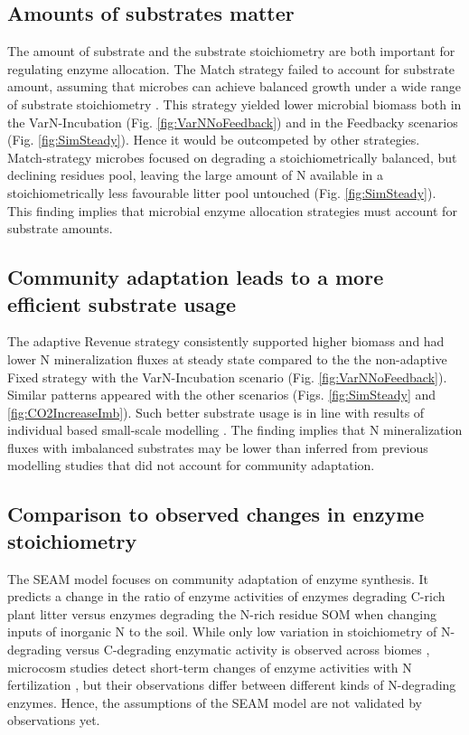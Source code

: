\subsection{Amounts of substrates matter}
The amount of substrate and the substrate stoichiometry are both important for
regulating enzyme allocation. The Match strategy failed to account for substrate
amount, assuming that microbes can achieve balanced growth under a wide range of
substrate stoichiometry \citep{Moorhead12, Ballantyne14}. This strategy yielded
lower microbial biomass both in the VarN-Incubation (Fig.
\ref{fig:VarNNoFeedback}) and in the Feedbacky scenarios (Fig.
\ref{fig:SimSteady}). Hence it would be outcompeted by other strategies.
Match-strategy microbes focused on degrading a stoichiometrically balanced, but
declining residues pool, leaving the large amount of N available in a
stoichiometrically less favourable litter pool untouched (Fig.
\ref{fig:SimSteady}). This finding implies that microbial enzyme allocation
strategies must account for substrate amounts.

\subsection{Community adaptation leads to a more efficient substrate usage}
The adaptive Revenue strategy consistently supported higher biomass and had
lower N mineralization fluxes at steady state compared to the the non-adaptive
Fixed strategy with the VarN-Incubation scenario (Fig.
\ref{fig:VarNNoFeedback}). Similar patterns appeared with the other scenarios
(Figs. \ref{fig:SimSteady} and \ref{fig:CO2IncreaseImb}). Such better substrate
usage is in line with results of individual based small-scale modelling
\citep{Kaiser14}.
The finding implies that N mineralization fluxes with imbalanced substrates may
be lower than inferred from previous modelling studies that did not account for
community adaptation.

\subsection{Comparison to observed changes in enzyme stoichiometry}

The SEAM model focuses on community adaptation of enzyme synthesis. It predicts
a change in the ratio of enzyme activities of enzymes degrading C-rich plant
litter versus enzymes degrading the N-rich residue SOM when changing inputs of
inorganic N to the soil.
While only low variation in stoichiometry of N-degrading versus C-degrading
enzymatic activity is observed across biomes \citep{Sinsabaugh09}, microcosm
studies detect short-term changes of enzyme activities with N fertilization
\citep{Kumar16}, but their observations differ between different kinds of
N-degrading enzymes.  Hence, the assumptions of the SEAM model are not validated
by observations yet. 

